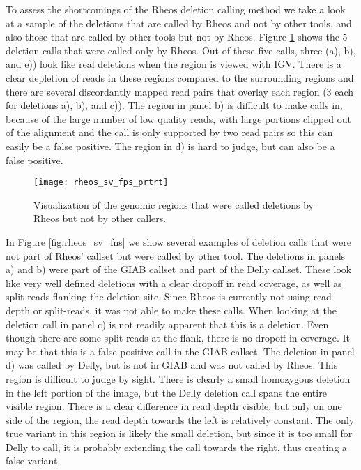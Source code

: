 To assess the shortcomings of the Rheos deletion calling method we take a look at a sample of the deletions that are called by Rheos and not by other tools, and also those that are called by other tools but not by Rheos. Figure \ref{fig:rheos_sv_fps} shows the 5 deletion calls that were called only by Rheos. Out of these five calls, three (a), b), and e)) look like real deletions when the region is viewed with IGV. There is a clear depletion of reads in these regions compared to the surrounding regions and there are several discordantly mapped read pairs that overlay each region (3 each for deletions a), b), and c)). The region in panel b) is difficult to make calls in, because of the large number of low quality reads, with large portions clipped out of the alignment and the call is only supported by two read pairs so this can easily be a false positive. The region in d) is hard to judge, but can also be a false positive. 

\begin{figure}[H]
    \texttt{[image: rheos\_sv\_fps\_prtrt]}
    \centering
    \caption {Visualization of the genomic regions that were called deletions by Rheos but not by other callers.}
    \label{fig:rheos_sv_fps}
\end{figure}

In Figure \ref{fig:rheos_sv_fns} we show several examples of deletion calls that were not part of Rheos' callset but were called by other tool. The deletions in panels a) and b) were part of the GIAB callset and part of the Delly callset. These look like very well defined deletions with a clear dropoff in read coverage, as well as split-reads flanking the deletion site. Since Rheos is currently not using read depth or split-reads, it was not able to make these calls. When looking at the deletion call in panel c) is not readily apparent that this is a deletion. Even though there are some split-reads at the flank, there is no dropoff in coverage. It may be that this is a false positive call in the GIAB callset. The deletion in panel d) was called by Delly, but is not in GIAB and was not called by Rheos. This region is difficult to judge by sight. There is clearly a small homozygous deletion in the left portion of the image, but the Delly deletion call spans the entire visible region. There is a clear difference in read depth visible, but only on one side of the region, the read depth towards the left is relatively constant. The only true variant in this region is likely the small deletion, but since it is too small for Delly to call, it is probably extending the call towards the right, thus creating a false variant. 

